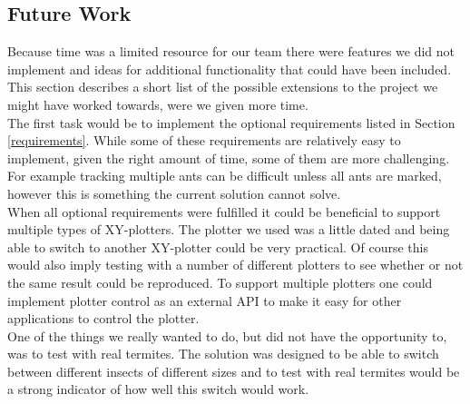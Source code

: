 
\subsection{Future Work}

Because time was a limited resource for our team there were features we did not implement and ideas for additional functionality that could have been included. This section describes a short list of the possible extensions to the project we might have worked towards, were we given more time. \\

The first task would be to implement the optional requirements listed in Section \ref{requirements}. While some of these requirements are relatively easy to implement, given the right amount of time, some of them are more challenging. For example tracking multiple ants can be difficult unless all ants are marked, however this is something the current solution cannot solve. \\

When all optional requirements were fulfilled it could be beneficial to support multiple types of XY-plotters. The plotter we used was a little dated and being able to switch to another XY-plotter could be very practical. Of course this would also imply testing with a number of different plotters to see whether or not the same result could be reproduced. To support multiple plotters one could implement plotter control as an external API to make it easy for other applications to control the plotter. \\

One of the things we really wanted to do, but did not have the opportunity to, was to test with real termites. The solution was designed to be able to switch between different insects of different sizes and to test with real termites would be a strong indicator of how well this switch would work. \\